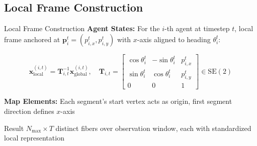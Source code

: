 \documentclass[10pt,aspectratio=169]{beamer}
\begin{document}
\subsection{Local Frame Construction}

\begin{frame}{Local Frame Construction}
\textbf{Agent States:} For the $i$-th agent at timestep $t$, local frame anchored at $\mathbf{p}_i^t = (p_{i,x}^t, p_{i,y}^t)$ with $x$-axis aligned to heading $\theta_i^t$:

\begin{equation}
\mathbf{x}^{(i,t)}_{\text{local}} = \mathbf{T}_{i,t}^{-1} \mathbf{x}_{\text{global}}^{(i,t)}, \quad
\mathbf{T}_{i,t} = \begin{bmatrix}
\cos\theta_i^t & -\sin\theta_i^t & p_{i,x}^t \\
\sin\theta_i^t & \cos\theta_i^t & p_{i,y}^t \\
0 & 0 & 1
\end{bmatrix} \in \mathrm{SE}(2)
\end{equation}

\vspace{0.3cm}

\textbf{Map Elements:} Each segment's start vertex acts as origin, first segment direction defines $x$-axis

\begin{block}{Result}
$N_{\max} \times T$ distinct fibers over observation window, each with standardized local representation
\end{block}
\end{frame}
\end{document}
